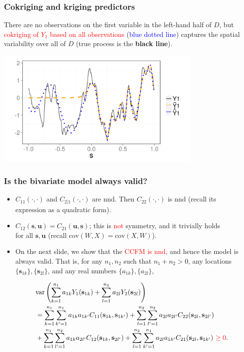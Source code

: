 \documentclass{beamer}
\newcommand{\svec} {\textbf{s}}
\newcommand{\uvec} {\textbf{u}}
\newcommand{\s}{\mathbf{s}}
\renewcommand{\u}{\mathbf{u}}
\newcommand{\cov}{\mathrm{cov}}
\newcommand{\var}{\mathrm{var}}
\begin{document}

\begin{frame}
\frametitle{Cokriging and kriging predictors}
There are no observations on the first variable in the left-hand half of $D$, but \textcolor{red}{cokriging of $Y_1$ based on all observations} (\textcolor{blue}{blue dotted line}) captures the spatial variability over all of $D$ (true process is the \textbf{black line}).
\vspace{-.5cm}
\begin{center}
\includegraphics[width=4in]{./sim_est.png}
\end{center}
\end{frame}


\begin{frame}
\frametitle{Is the bivariate model always valid?}

\begin{itemize}
\item $C_{11}(\cdot,\cdot)$ and $C_{2|1}(\cdot,\cdot)$ are nnd. Then $C_{22}(\cdot,\cdot)$ is nnd (recall its expression as a quadratic form).
\item $C_{12}(\svec,\uvec) = C_{21}(\uvec,\svec)$; this is \textcolor{red}{not} symmetry, and it trivially holds \\for all $\s,\u$ (recall $\cov(W,X)=\cov(X,W)$).
\item On the next slide, we show that the \textcolor{red}{CCFM is nnd}, and hence the model is always valid. That is, for any $n_1,n_2$ such that $n_1 + n_2 > 0$, any locations $\{\svec_{1k}\}, \{\svec_{2l}\}$, and any real numbers $\{a_{1k}\},\{a_{2l}\}$,

\small
\begin{align*}
 & \var\left(\sum_{k=1}^{n_1}{a_{1k}Y_1(\s_{1k})}+\sum_{l=1}^{n_2}{a_{2l}Y_2(\s_{2l})}\right) \\ &=\sum_{k=1}^{n_1}\sum_{k'=1}^{n_1} a_{1k}a_{1k'}C_{11}(\s_{1k},\s_{1k'})+\sum_{l=1}^{n_2}\sum_{l'=1}^{n_2} a_{2l}a_{2l'}C_{22}(\s_{2l},\s_{2l'}) \\
  &+\sum_{k=1}^{n_1}\sum_{l'=1}^{n_2} a_{1k}a_{2l'}C_{12}(\s_{1k},\s_{2l'})+\sum_{l=1}^{n_2}\sum_{k'=1}^{n_1} a_{2l}a_{1k'}C_{21}(\s_{2l},\s_{1k'})~ \textcolor{red}{\ge 0}.
\end{align*}

\normalsize
\end{itemize}
\end{frame}
\end{document}
